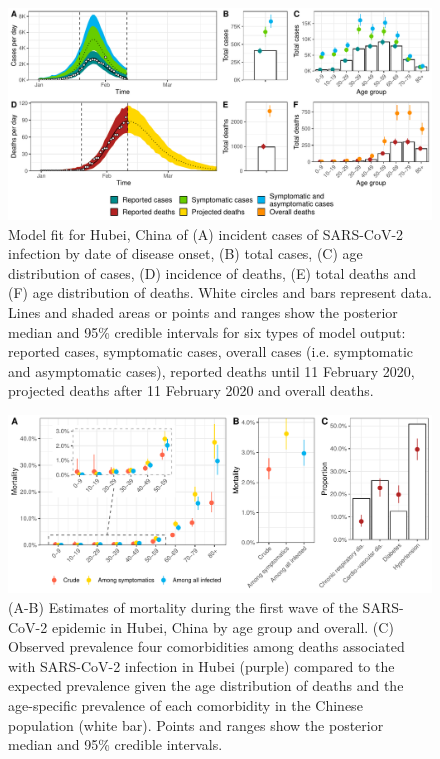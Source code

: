 \documentclass{article}
\begin{document}
\begin{figure}[h]
	\includegraphics[width=\linewidth]{../format_output/figures/modelfit_china.pdf}
	\caption{Model fit for Hubei, China of (A) incident cases of SARS-CoV-2 infection by date of disease onset, (B) total cases, (C) age distribution of cases, (D) incidence of deaths, (E) total deaths and (F) age distribution of deaths. White circles and bars represent data. Lines and shaded areas or points and ranges show the posterior median and 95\% credible intervals for six types of model output: reported cases, symptomatic cases, overall cases (i.e. symptomatic and asymptomatic cases), reported deaths until 11 February 2020, projected deaths after 11 February 2020 and overall deaths.}
	\label{fig:fit}
\end{figure}

\begin{figure}[h]
	\includegraphics[width=\linewidth]{../format_output/figures/cfr_china_bis.pdf}
	\caption{(A-B) Estimates of mortality during the first wave of the SARS-CoV-2 epidemic in Hubei, China by age group and overall. (C) Observed prevalence four comorbidities among deaths associated with SARS-CoV-2 infection in Hubei (purple) compared to the expected prevalence given the age distribution of deaths and the age-specific prevalence of each comorbidity in the Chinese population (white bar). Points and ranges show the posterior median and 95\% credible intervals.}
	\label{fig:mortality}
\end{figure}
\end{document}
